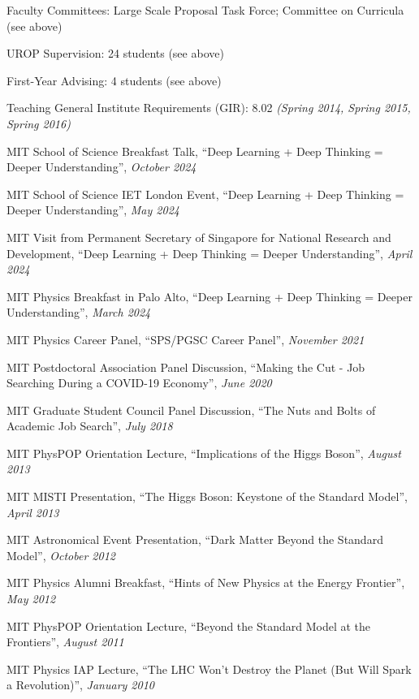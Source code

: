 \item Faculty Committees: Large Scale Proposal Task Force; Committee on Curricula (see above) 
\item UROP Supervision: 24 students (see above) 
\item First-Year Advising: 4 students (see above) 
\item Teaching General Institute Requirements (GIR):  8.02 \emph{(Spring 2014, Spring 2015, Spring 2016)}
\item MIT School of Science Breakfast Talk, ``Deep Learning + Deep Thinking = Deeper Understanding'', \emph{October 2024}
\item MIT School of Science IET London Event, ``Deep Learning + Deep Thinking = Deeper Understanding'', \emph{May 2024}
\item MIT Visit from Permanent Secretary of Singapore for National Research and Development, ``Deep Learning + Deep Thinking = Deeper Understanding'', \emph{April 2024}
\item MIT Physics Breakfast in Palo Alto, ``Deep Learning + Deep Thinking = Deeper Understanding'', \emph{March 2024}
\item MIT Physics Career Panel, ``SPS/PGSC Career Panel'', \emph{November 2021}
\item MIT Postdoctoral Association Panel Discussion, ``Making the Cut - Job Searching During a COVID-19 Economy'', \emph{June 2020}
\item MIT Graduate Student Council Panel Discussion, ``The Nuts and Bolts of Academic Job Search'', \emph{July 2018}
\item MIT PhysPOP Orientation Lecture, ``Implications of the Higgs Boson'', \emph{August 2013}
\item MIT MISTI Presentation, ``The Higgs Boson: Keystone of the Standard Model'', \emph{April 2013}
\item MIT Astronomical Event Presentation, ``Dark Matter Beyond the Standard Model'', \emph{October 2012}
\item MIT Physics Alumni Breakfast, ``Hints of New Physics at the Energy Frontier'', \emph{May 2012}
\item MIT PhysPOP Orientation Lecture, ``Beyond the Standard Model at the Frontiers'', \emph{August 2011}
\item MIT Physics IAP Lecture, ``The LHC Won’t Destroy the Planet (But Will Spark a Revolution)'', \emph{January 2010}
